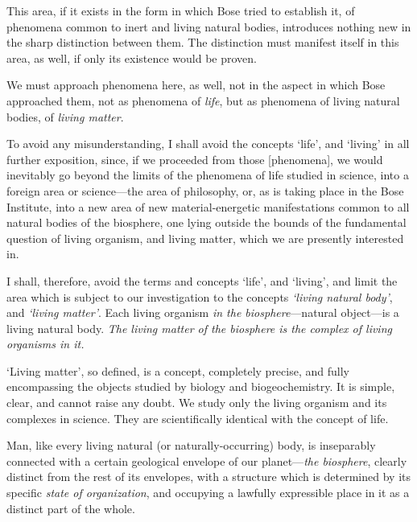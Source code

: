This area, if it exists in the form in which Bose tried to establish it, of
phenomena common to inert and living natural bodies, introduces nothing new in
the sharp distinction between them.  The distinction must manifest itself in
this area, as well, if only its existence would be proven.

We must approach phenomena here, as well, not in the aspect in which Bose
approached them, not as phenomena of \emph{life}, but as phenomena of living
natural bodies, of \emph{living matter}.

To avoid any misunderstanding, I shall avoid the concepts `life', and `living'
in all further exposition, since, if we proceeded from those
[phenomena], we would inevitably
go beyond the limits of the phenomena of life studied in science, into a
foreign area or science---the area of philosophy, or, as is taking place in the
Bose Institute, into a new area of new material-energetic manifestations common
to all natural bodies of the biosphere, one lying outside the bounds of the
fundamental question of living organism, and living matter, which we are
presently interested in.

I shall, therefore, avoid the terms and concepts `life', and `living', and
limit the area which is subject to our investigation to the concepts
\emph{`living natural body'}, and \emph{`living matter'}.  Each living organism
\emph{in the biosphere}---natural object---is a living natural body.  \emph{The
living matter of the biosphere is the complex of living organisms in it.}

`Living matter', so defined, is a concept, completely precise, and fully
encompassing the objects studied by biology and biogeochemistry.  It is simple,
clear, and cannot raise any doubt.  We study only the living organism and its
complexes in science.  They are scientifically identical with the concept of
life.


\Section %
Man, like every living natural (or naturally-occurring) body, is inseparably connected with a certain geological
envelope of our planet---\emph{the biosphere}, clearly distinct from the rest
of its envelopes, with a structure which is determined by its specific
\emph{state of organization}, and occupying a
lawfully expressible place in it as a distinct part of the whole.

